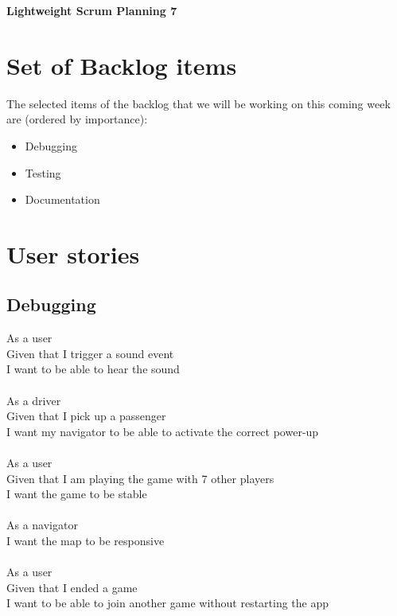 \documentclass{article}
\begin{document}
\begin{minipage}[H]{\textwidth}
\vspace{0.3cm}
		\begin{center}
		\vspace{0.3cm}
			\Huge{\textbf{Lightweight Scrum Planning 7}}\\
		\vspace{0.3cm}	
		\vspace{0.7cm}		
		\end{center}
	\end{minipage}

\section*{Set of Backlog items}
The selected items of the backlog that we will be working on this coming week  are (ordered by importance):
\begin{itemize}
	\item Debugging
	\item Testing
	\item Documentation
\end{itemize}

\section*{User stories}
\subsection*{Debugging}
As a user\\
Given that I trigger a sound event\\
I want to be able to hear the sound\\\\
As a driver\\
Given that I pick up a passenger\\
I want my navigator to be able to activate the correct power-up\\\\
As a user\\
Given that I am playing the game with 7 other players\\
I want the game to be stable\\\\
As a navigator\\
I want the map to be responsive\\\\
As a user\\
Given that I ended a game\\
I want to be able to join another game without restarting the app\\\\
\end{document}
